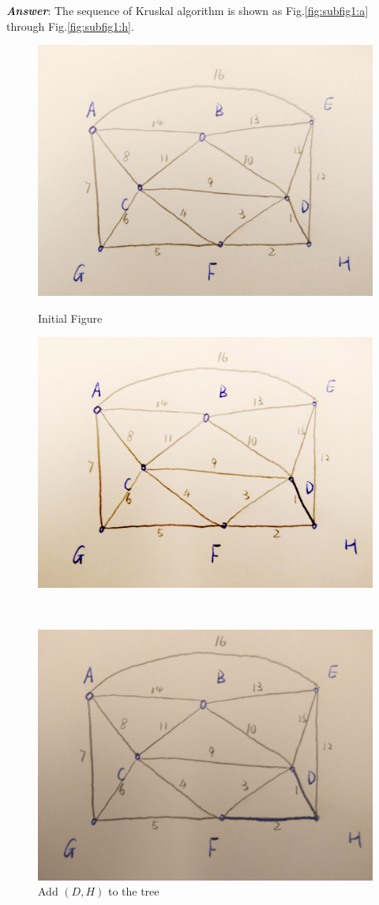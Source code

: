 \documentclass[11pt]{article}
\begin{document}
\noindent \textbf{\emph{Answer}}: The sequence of Kruskal algorithm is shown as Fig.\ref{fig:subfig1:a} through Fig.\ref{fig:subfig1:h}.
\begin{figure}[!h]
	\begin{minipage}[t]{0.50\linewidth}
		\centering
		\includegraphics[width=0.75\linewidth]{Figure/1a1.jpg}
		\caption{Initial Figure}
		\label{fig:subfig1:a}
	\end{minipage}
	\begin{minipage}[t]{0.50\linewidth}
		\centering
		\includegraphics[width=0.75\linewidth]{Figure/1a2.jpg}
		\caption{Add $(D,H)$ to the tree}
		\label{fig:subfig1:b}
	\end{minipage}
\\
	\begin{minipage}[t]{0.50\linewidth}
		\centering
		\includegraphics[width=0.75\linewidth]{Figure/1a3.jpg}

\end{minipage}
\end{figure}
\end{document}
